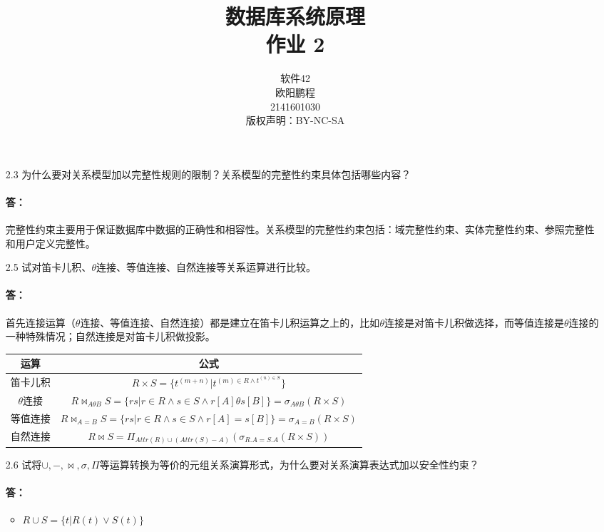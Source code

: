 \documentclass[UTF8]{ctexart}
\title{数据库系统原理 \\ 作业 2}
\author{软件42 \\ 欧阳鹏程 \\ 2141601030 \\ 版权声明：BY-NC-SA}
\begin{document}
\maketitle

\begin{itemize}
	\item[2.3] 为什么要对关系模型加以完整性规则的限制？关系模型的完整性约束具体包括哪些内容？
	\paragraph{答：}完整性约束主要用于保证数据库中数据的正确性和相容性。关系模型的完整性约束包括：域完整性约束、实体完整性约束、参照完整性和用户定义完整性。
	
	\item[2.5] 试对笛卡儿积、$\theta$连接、等值连接、自然连接等关系运算进行比较。
	\paragraph{答：}首先连接运算（$\theta$连接、等值连接、自然连接）都是建立在笛卡儿积运算之上的，比如$\theta$连接是对笛卡儿积做选择，而等值连接是$\theta$连接的一种特殊情况；自然连接是对笛卡儿积做投影。
	
	\begin{center}
		\begin{tabular}{|c|c|}
			\hline
			运算 & 公式 \\\hline
			笛卡儿积 & $R \times S = \{t^{(m+n)}| t^{(m) \in R \wedge t^{(n) \in S}}\}$ \\\hline
			
			$\theta$连接 & $R \bowtie_{A \theta B} S = \{rs|r \in R \wedge s \in S \wedge r[A] \theta s[B]\} = \sigma_{A \theta B}(R \times S)$ \\\hline
			
			等值连接 & $R \bowtie_{A = B} S = \{rs|r \in R \wedge s \in S \wedge r[A] = s[B]\} = \sigma_{A = B}(R \times S)$ \\\hline
			
			自然连接 & $R \bowtie S = \Pi_{Attr(R) \cup (Attr(S) - A)}(\sigma_{R.A = S.A}(R \times S))$ \\\hline
		\end{tabular}
	\end{center}
	
	\item[2.6] 试将$\cup, -, \bowtie, \sigma, \Pi$等运算转换为等价的元组关系演算形式，为什么要对关系演算表达式加以安全性约束？
	\paragraph{答：}
	\begin{itemize}
		\item $R \cup S = \{t|R(t) \vee S(t)\}$
		

\end{itemize}
\end{itemize}
\end{document}
